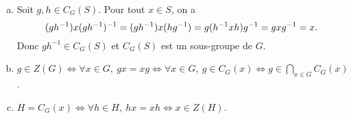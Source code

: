 \begin{enumerate}[a)]
  \item Soit $g,h\in C_G(S)$. Pour tout $x\in S$, on a
    \[
      (gh^{-1})x(gh^{-1})^{-1} = (gh^{-1})x(hg^{-1})
      = g(h^{-1}xh)g^{-1}
      = gxg^{-1} \\
      = x.
    \]
    Donc $gh^{-1}\in C_G(S)$ et $C_G(S)$ est un sous-groupe de $G$.

  \item $g\in Z(G) \Leftrightarrow \forall x\in G,\: gx=xg
    \Leftrightarrow \forall x\in G,\: g\in C_G(x)
    \Leftrightarrow g\in\bigcap_{x\in G} C_G(x)$.
  
  \item $H = C_G(x) \Leftrightarrow \forall h\in H,\: hx=xh 
    \Leftrightarrow x\in Z(H)$.
\end{enumerate}

